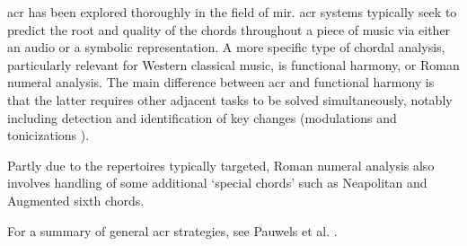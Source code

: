 


\gls{acr} has been explored thoroughly in the field of
\gls{mir}. \gls{acr} systems typically seek to predict the
root and quality of the chords throughout a piece of music
via either an audio or a symbolic representation. A more
specific type of chordal analysis, particularly relevant for
Western classical music, is functional harmony, or Roman
numeral analysis. The main difference between \gls{acr} and
functional harmony is that the latter requires other
adjacent tasks to be solved simultaneously, notably
including detection and identification of key changes
(modulations \parencite{feisthauer2020estimating,
schreiber2020local} and tonicizations
\parencite{napoleslopez2020local}).

Partly due to the repertoires typically targeted, Roman
numeral analysis also involves handling of some additional
`special chords' such as Neapolitan and Augmented sixth
chords.

For a summary of general \gls{acr} strategies, see Pauwels
et al. \parencite{pauwels201920}.
